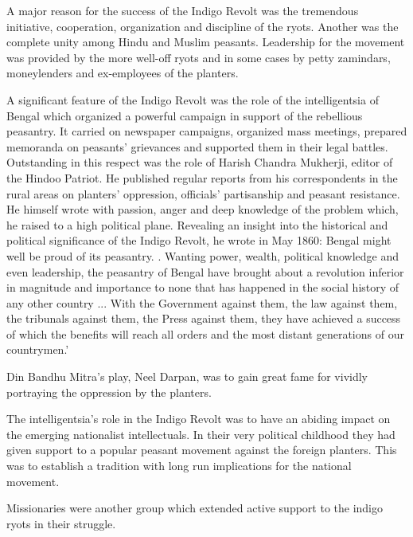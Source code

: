 \begin{multicols}{2}
A major reason for the success of the Indigo Revolt was the tremendous initiative, cooperation, organization and discipline of the ryots. Another was the complete unity among Hindu and Muslim peasants. Leadership for the movement was provided by the more well-off ryots and in some cases by petty zamindars, moneylenders and ex-employees of the planters.

A significant feature of the Indigo Revolt was the role of the intelligentsia of Bengal which organized a powerful campaign in support of the rebellious peasantry. It carried on newspaper campaigns, organized mass meetings, prepared memoranda on peasants' grievances and supported them in their legal battles. Outstanding in this respect was the role of Harish Chandra Mukherji, editor of the Hindoo Patriot. He published regular reports from his correspondents in the rural areas on planters' oppression, officials' partisanship and peasant resistance. He himself wrote with passion, anger and deep knowledge of the problem which, he raised to a high political plane. Revealing an insight into the historical and political significance of the Indigo Revolt, he wrote in May 1860: Bengal might well be proud of its peasantry. . Wanting power, wealth, political knowledge and even leadership, the peasantry of Bengal have brought about a revolution inferior in magnitude and importance to none that has happened in the social history of any other country ... With the Government against them, the law against them, the tribunals against them, the Press against them, they have achieved a success of which the benefits will reach all orders and the most distant generations of our countrymen.'

Din Bandhu Mitra's play, Neel Darpan, was to gain great fame for vividly portraying the oppression by the planters.

The intelligentsia's role in the Indigo Revolt was to have an abiding impact on the emerging nationalist intellectuals. In their very political childhood they had given support to a popular peasant movement against the foreign planters. This was to establish a tradition with long run implications for the national movement.

Missionaries were another group which extended active support to the indigo ryots in their struggle.


\end{multicols}
